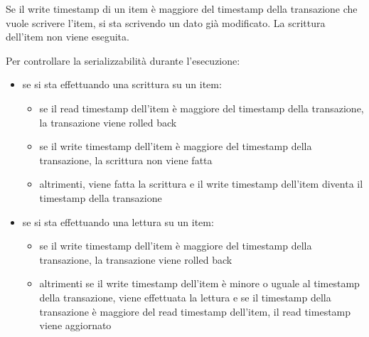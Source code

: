Se il write timestamp di un item \`e maggiore del timestamp della transazione che vuole scrivere l'item, si sta scrivendo un dato gi\`a modificato. La scrittura dell'item non viene eseguita.

Per controllare la serializzabilit\`a durante l'esecuzione:
\begin{itemize}
    \item se si sta effettuando una scrittura su un item:
    \begin{itemize}
        \item se il read timestamp dell'item \`e maggiore del timestamp della transazione, la transazione viene rolled back
        \item se il write timestamp dell'item \`e maggiore del timestamp della transazione, la scrittura non viene fatta
        \item altrimenti, viene fatta la scrittura e il write timestamp dell'item diventa il timestamp della transazione
    \end{itemize}
    \item se si sta effettuando una lettura su un item:
    \begin{itemize}
        \item se il write timestamp dell'item \`e maggiore del timestamp della transazione, la transazione viene rolled back
        \item altrimenti se il write timestamp dell'item \`e minore o uguale al timestamp della transazione, viene effettuata la lettura e se il timestamp della transazione \`e maggiore del read timestamp dell'item, il read timestamp viene aggiornato
    \end{itemize}
\end{itemize}




\clearpage

\tableofcontents



